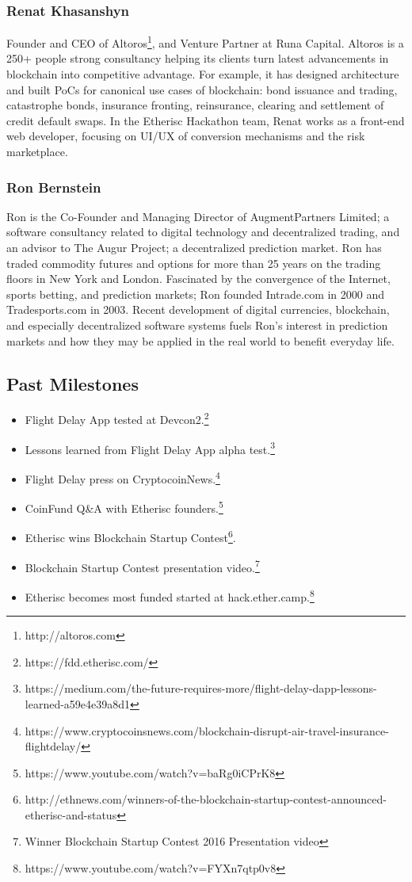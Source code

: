 \documentclass[12pt]{article}
\begin{document}
\subsubsection{Renat Khasanshyn}

Founder and CEO of Altoros\footnote{http://altoros.com}, and Venture Partner at Runa Capital. Altoros is a 250+ people strong consultancy helping its clients turn latest advancements in blockchain into competitive advantage. For example, it has designed architecture and built PoCs for canonical use cases of blockchain: bond issuance and trading, catastrophe bonds, insurance fronting, reinsurance, clearing and settlement of credit default swaps. In the Etherisc Hackathon team, Renat works as a front-end web developer, focusing on UI/UX of conversion mechanisms and the risk marketplace.

\subsubsection{Ron Bernstein}

Ron is the Co-Founder and Managing Director of AugmentPartners Limited; a software consultancy related to digital technology and decentralized trading, and an advisor to The Augur Project; a decentralized prediction market. Ron has traded commodity futures and options for more than 25 years on the trading floors in New York and London. Fascinated by the convergence of the Internet, sports betting, and prediction markets; Ron founded Intrade.com in 2000 and Tradesports.com in 2003. Recent development of digital currencies, blockchain, and especially decentralized software systems fuels Ron’s interest in prediction markets and how they may be applied in the real world to benefit everyday life.

\subsection{Past Milestones}

\begin{itemize}
    \item Flight Delay App tested at Devcon2.\footnote{https://fdd.etherisc.com/}
    \item Lessons learned from Flight Delay App alpha test.\footnote{https://medium.com/the-future-requires-more/flight-delay-dapp-lessons-learned-a59e4e39a8d1}
    \item Flight Delay press on CryptocoinNews.\footnote{https://www.cryptocoinsnews.com/blockchain-disrupt-air-travel-insurance-flightdelay/}
    \item CoinFund Q\&A with Etherisc founders.\footnote{https://www.youtube.com/watch?v=baRg0iCPrK8}
    \item Etherisc wins Blockchain Startup Contest\footnote{http://ethnews.com/winners-of-the-blockchain-startup-contest-announced-etherisc-and-status}. 
    \item Blockchain Startup Contest presentation video.\footnote{Winner Blockchain Startup Contest 2016
Presentation video}
    \item Etherisc becomes most funded started at hack.ether.camp.\footnote{https://www.youtube.com/watch?v=FYXn7qtp0v8}
\end{itemize}
\end{document}
